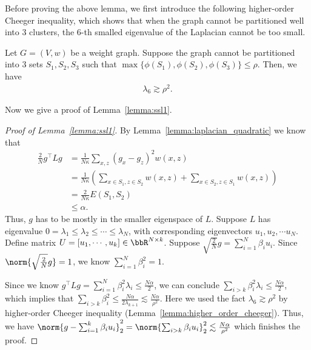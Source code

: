 Before proving the above lemma, we first introduce the following higher-order Cheeger inequality, which shows that when the graph cannot be partitioned well into $3$ clusters, the $6$-th smalled eigenvalue of the Laplacian cannot be too small. 
\begin{lemma}\label{lemma:higher_order_cheeger}
	Let $G=(V, w)$ be a weight graph.  Suppose the graph cannot be partitioned into $3$ sets $S_1, S_2, S_3$ such that $\max\{\phi(S_1), \phi(S_2), \phi(S_3)\} \le \rho$. Then, we have
	\begin{align*}
		 \lambda_{6} \gtrsim\rho^2.
	\end{align*}
\end{lemma}

Now we give a proof of Lemma~\ref{lemma:ssl1}.
\begin{proof}[Proof of Lemma~\ref{lemma:ssl1}]
	By Lemma~\ref{lemma:laplacian_quadratic} we know that 
\begin{align}
	\frac{2}{N} g^\top L g &= \frac{1}{N\kappa} \sum_{x, z} (g_x - g_z)^2 w(x, z)\\
	&= \frac{1}{N\kappa} \left(\sum_{x\in S_1, z\in S_2} w(x, z) + \sum_{x\in S_2, z\in S_1} w(x, z)\right)\\
	&= \frac{2}{N\kappa} E(S_1, S_2) \\
	&\le \alpha.
\end{align}
Thus, $g$ has to be mostly in the smaller eigenspace of $L$.  Suppose $L$ has eigenvalue $0=\lambda_1\le\lambda_2 \le \cdots \le \lambda_N $, with corresponding eigenvectors $u_1, u_2, \cdots u_N$. Define matrix $U=[u_1, \cdots, u_k] \in \bbR^{N\times k}$. Suppose $\sqrt{\frac{2}{N}}g = \sum_{i=1}^N \beta_i u_i$. Since $\norm{\sqrt{\frac{2}{N}}g}=1$, we know $\sum_{i=1}^N \beta_i^2 = 1$.

Since we know $g^\top L g = \sum_{i=1}^N \beta_i^2 \lambda_i \le \frac{N\alpha}{2}$, we can conclude $\sum_{i>k} \beta_i^2 \lambda_i \le \frac{N\alpha}{2}$, which implies that $\sum_{i>k}\beta_i^2 \le \frac{N\alpha}{2\lambda_{k+1}} \lesssim \frac{N\alpha}{\rho^2}$. Here we used the fact $\lambda_6 \gtrsim \rho^2$ by higher-order Cheeger inequality (Lemma~\ref{lemma:higher_order_cheeger}). Thus, we have $\norm{g-\sum_{i=1}^k \beta_i u_i}_2^2 = \norm{\sum_{i>k} \beta_i u_i}_2^2 \lesssim \frac{N\alpha}{\rho^2}$ which finishes the proof. 
\end{proof}

